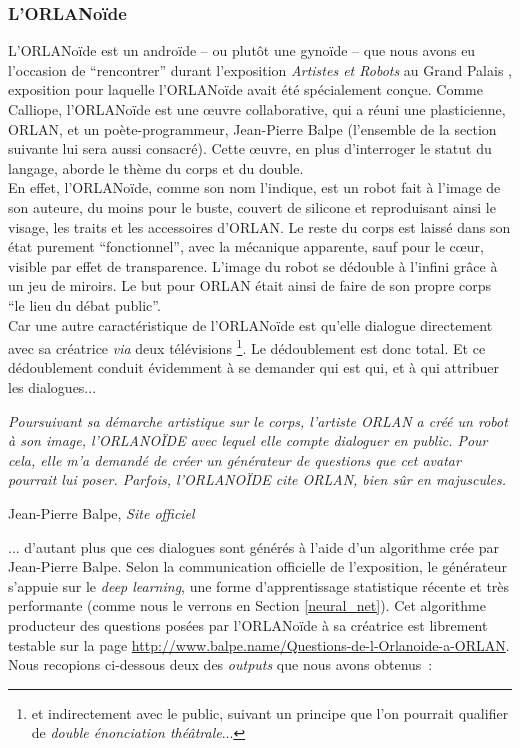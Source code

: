 \documentclass{article}
\newenvironment{citationbox}
{\begin{center}
		\begin{minipage}{.8\textwidth}
		}
		{
		\end{minipage}	
\end{center}
}
\begin{document}
			\subsubsection{L'ORLANoïde}
				L'ORLANoïde est un androïde -- ou plutôt une gynoïde -- que nous avons eu l'occasion de ``rencontrer'' durant l'exposition \textit{Artistes et Robots} au Grand Palais \cite{artistes_robots}, exposition pour laquelle l'ORLANoïde avait été spécialement conçue. Comme Calliope, l'ORLANoïde est une œuvre collaborative, qui a réuni une plasticienne, ORLAN, et un poète-programmeur, Jean-Pierre Balpe (l'ensemble de la section suivante lui sera aussi consacré). Cette œuvre, en plus d'interroger le statut du langage, aborde le thème du corps et du double.\\
				
				En effet, l'ORLANoïde, comme son nom l'indique, est un robot fait à l'image de son auteure, du moins pour le buste, couvert de silicone et reproduisant ainsi le visage, les traits et les accessoires d'ORLAN. Le reste du corps est laissé dans son état purement ``fonctionnel'', avec la mécanique apparente, sauf pour le cœur, visible par effet de transparence. L'image du robot se dédouble à l'infini grâce à un jeu de miroirs. Le but pour ORLAN était ainsi de faire de son propre corps ``le lieu du débat public''.\\
				Car une autre caractéristique de l'ORLANoïde est qu'elle dialogue directement avec sa créatrice \textit{via} deux télévisions \footnote{et indirectement avec le public, suivant un principe que l'on pourrait qualifier de \textit{double énonciation théâtrale}...}. Le dédoublement est donc total. Et ce dédoublement conduit évidemment à se demander qui est qui, et à qui attribuer les dialogues...
				\begin{citationbox}
					\textit{Poursuivant sa démarche artistique sur le corps, l’artiste ORLAN a créé un robot à son image, l’ORLANOÏDE avec lequel elle compte dialoguer en public. Pour cela, elle m’a demandé de créer un générateur de questions que cet avatar pourrait lui poser. Parfois, l’ORLANOÏDE cite ORLAN, bien sûr en majuscules.}\begin{flushright}
						Jean-Pierre Balpe, \textit{Site officiel} \cite{balpe_site}
					\end{flushright}
				\end{citationbox}
				... d'autant plus que ces dialogues sont générés à l'aide d'un algorithme crée par Jean-Pierre Balpe. Selon la communication officielle de l'exposition, le générateur s'appuie sur le \textit{deep learning}, une forme d'apprentissage statistique récente et très performante (comme nous le verrons en Section \ref{neural_net}). Cet algorithme producteur des questions posées par l'ORLANoïde à sa créatrice est librement testable sur la page \href{http://www.balpe.name/Questions-de-l-Orlanoide-a-ORLAN}{http://www.balpe.name/Questions-de-l-Orlanoide-a-ORLAN}. Nous recopions ci-dessous deux des \textit{outputs} que nous avons obtenus~:
\end{document}
